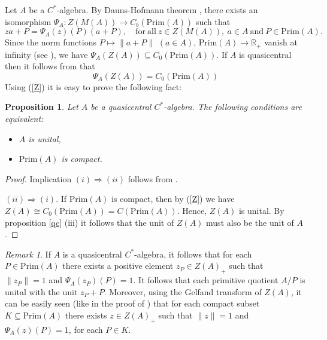 \documentclass[]{amsart}
\newtheorem{proposition}[theorem]{Proposition}
\theoremstyle{remark}
\newtheorem{remark}[theorem]{Remark}
\theoremstyle{definition}
\theoremstyle{question}
\numberwithin{equation}{section}
\begin{document}
Let $A$ be a $C^*$-algebra. By Dauns-Hofmann theorem \cite[A.34]{RW}, there
exists an isomorphism $\Psi_A : Z(M(A)) \to C_b(\mathrm{Prim}(A))$ such that $$za
+ P= \Psi_A(z)(P)(a+P), \quad \mathrm{for} \ \mathrm{all} \ z \in Z(M(A)), \ a \in
A \ \mathrm{and} \ P \in \mathrm{Prim}(A).$$
Since the norm functions $P \mapsto \|a+P\|$ $(a
\in A)$, $\mathrm{Prim}(A) \to {\mathbb{R}}_+$ vanish at infinity (see \cite[4.4.4]{Ped}), we have $\Psi_A(Z(A))\subseteq
C_0(\mathrm{Prim}(A)).$
If  $A$ is quasicentral then it follows from \cite{Arc1} that
\begin{equation}\label{Z}
\Psi_A(Z(A))=C_0(\mathrm{Prim}(A))
\end{equation}
 Using (\ref{Z}) it is easy to prove the following fact:
\begin{proposition}\label{unit} Let $A$ be a quasicentral $C^*$-algebra. The
following conditions are equivalent:
\begin{itemize}\item[(ii)] $A$ is unital,
\item[(ii)] $\mathrm{Prim}(A)$ is compact.
\end{itemize}
\end{proposition}
\begin{proof} Implication $(i) \Rightarrow (ii)$ follows from \cite[3.1.8]{Dix}.

$(ii) \Rightarrow (i)$. If $\mathrm{Prim}(A)$ is compact, then by (\ref{Z}) we
have $Z(A) \cong C_0(\mathrm{Prim}(A))=C(\mathrm{Prim}(A))$.
Hence, $Z(A)$ is unital. By proposition \ref{qc} (iii) it follows that the unit
of $Z(A)$ must also be the unit of $A$.
\end{proof}

\begin{remark}\label{un}
If $A$ is a quasicentral $C^*$-algebra, it follows that for each $P \in
\mathrm{Prim}(A)$ there exists a positive element $z_P \in Z(A)_+$
such that $\|z_P\|=1$ and $\Psi_A(z_P)(P)=1$. It follows that each primitive quotient $A/P$ is
unital with the unit $z_P+P$. Moreover, using the Gelfand transform of $Z(A)$, it can be easily seen (like in the proof of \cite[Thm. 5]{Arc1}) that for each compact subset $K \subseteq \mathrm{Prim}(A)$ there
exists $z \in Z(A)_+$ such that $\|z\|=1$ and $\Psi_A(z)(P)=1$, for each $P \in
K$.
\end{remark}
\end{document}
